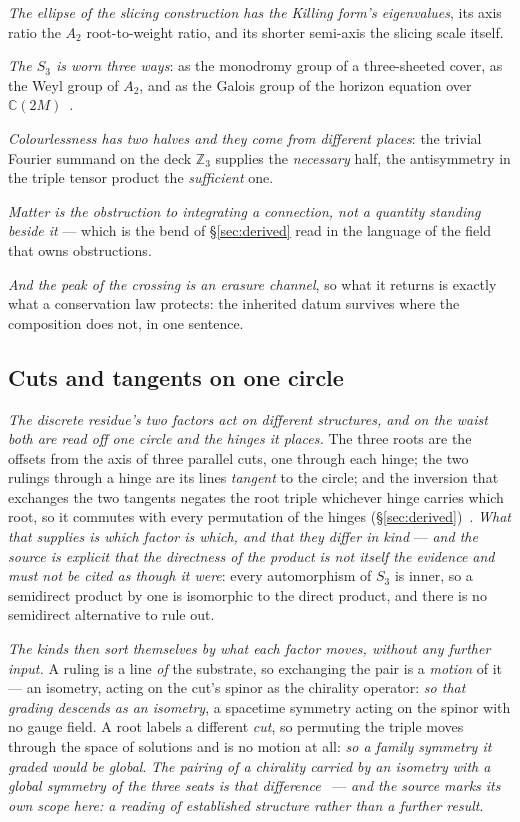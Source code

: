 \documentclass[11pt,a4paper]{article}
\theoremstyle{plain}
\theoremstyle{definition}
\begin{document}
\emph{The ellipse of the slicing construction has the Killing form's eigenvalues}, its axis ratio the
$A_{2}$ root-to-weight ratio, and its shorter semi-axis the slicing scale itself.

\emph{The $S_{3}$ is worn three ways}: as the monodromy group of a three-sheeted cover, as the Weyl group of
$A_{2}$, and as the Galois group of the horizon equation over $\mathbb{C}(2M)$~\cite{JanzenGroupoid}.

\emph{Colourlessness has two halves and they come from different places}: the trivial Fourier summand on the
deck $\mathbb{Z}_{3}$ supplies the \emph{necessary} half, the antisymmetry in the triple tensor product the
\emph{sufficient} one.

\emph{Matter is the obstruction to integrating a connection, not a quantity standing beside it} --- which is
the bend of \S\ref{sec:derived} read in the language of the field that owns obstructions.

\emph{And the peak of the crossing is an erasure channel}, so what it returns is exactly what a conservation
law protects: the inherited datum survives where the composition does not, in one sentence.

\subsection{Cuts and tangents on one circle}

\emph{The discrete residue's two factors act on different structures, and on the waist both are read off one
circle and the hinges it places.} The three roots are the offsets from the axis of three parallel cuts, one
through each hinge; the two rulings through a hinge are its lines \emph{tangent} to the circle; and the
inversion that exchanges the two tangents negates the root triple whichever hinge carries which root, so it
commutes with every permutation of the hinges (\S\ref{sec:derived})~\cite{JanzenMatter}. \emph{What that
supplies is which factor is which, and that they differ in kind} --- \emph{and the source is explicit that the
directness of the product is not itself the evidence and must not be cited as though it were}: every
automorphism of $S_{3}$ is inner, so a semidirect product by one is isomorphic to the direct product, and
there is no semidirect alternative to rule out.

\emph{The kinds then sort themselves by what each factor moves, without any further input.} A ruling is a line
\emph{of} the substrate, so exchanging the pair is a \emph{motion} of it --- an isometry, acting on the cut's
spinor as the chirality operator: \emph{so that grading descends as an isometry}, a spacetime symmetry acting on the spinor with no gauge field. A root labels a different
\emph{cut}, so permuting the triple moves through the space of solutions and is no motion at all: \emph{so a
family symmetry it graded would be global}. \emph{The pairing of a chirality carried by an isometry with a global
symmetry of the three seats is that difference}~\cite{JanzenMatter} --- \emph{and the source marks its own
scope here: a reading of established structure rather than a further result}.
\end{document}
